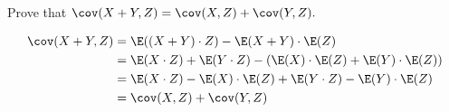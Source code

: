 \question Prove that $\cov(X + Y, Z) = \cov(X, Z) + \cov(Y, Z).$
\begin{solution}[1 cm]
\begin{equation}
\begin{split}
\cov(X + Y, Z) &= \E((X + Y) \cdot Z) - \E(X + Y) \cdot \E(Z) \\ \nonumber
	          &= \E(X \cdot Z) + \E(Y \cdot Z) - (\E(X) \cdot \E(Z) + 
	          \E(Y) \cdot \E(Z)) \\
           &= \E(X \cdot Z) - \E(X) \cdot \E(Z) + \E(Y \cdot Z) - 
           \E(Y) \cdot \E(Z) \\
           &= \cov(X, Z) + \cov(Y, Z) 
\end{split}
\end{equation}
\end{solution}